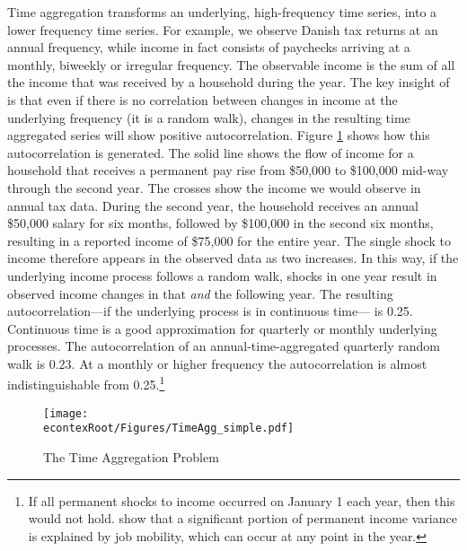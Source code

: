 \documentclass[titlepage]{\econtex}\newcommand{\texname}{ConsumptionHeterogeneity}
\begin{document}
	Time aggregation transforms an underlying, high-frequency time series, into a lower frequency time series.
	For example, we observe Danish tax returns at an annual frequency, while income in fact consists of paychecks arriving at a monthly, biweekly or irregular frequency.
	The observable income is the sum of all the income that was received by a household during the year. The key insight of \cite{working_note_1960} is that even if there is no correlation between changes in income at the underlying frequency (it is a random walk), changes in the resulting time aggregated series will show positive autocorrelation.
	Figure \ref{fig:TimeAgg} shows how this autocorrelation is generated. The solid line shows the flow of income for a household that receives a permanent pay rise from \$50,000 to \$100,000 mid-way through the second year.
	The crosses show the income we would observe in annual tax data.
	During the second year, the household receives an annual \$50,000 salary for six months, followed by \$100,000 in the second six months, resulting in a reported income of \$75,000 for the entire year.
	The single shock to income therefore appears in the observed data as two increases.
	In this way, if the underlying income process follows a random walk, shocks in one year result in observed income changes in that \textit{and} the following year. The resulting autocorrelation---if the underlying process is in continuous time--- is 0.25.
	Continuous time is a good approximation for quarterly or monthly underlying processes.
	The autocorrelation of an annual-time-aggregated quarterly random walk is 0.23.
	At a monthly or higher frequency the autocorrelation is almost indistinguishable from 0.25.\footnote{If all permanent shocks to income occurred on January 1 each year, then this would not hold. \cite{low_wage_2010} show that a significant portion of permanent income variance is explained by job mobility, which can occur at any point in the year.}
	\begin{figure} 
		\begin{centering}
			\texttt{[image: \\econtexRoot/Figures/TimeAgg\_simple.pdf]} 
			\caption{The Time Aggregation Problem}
			\label{fig:TimeAgg}
		\end{centering}
	\end{figure}
	
\end{document}

